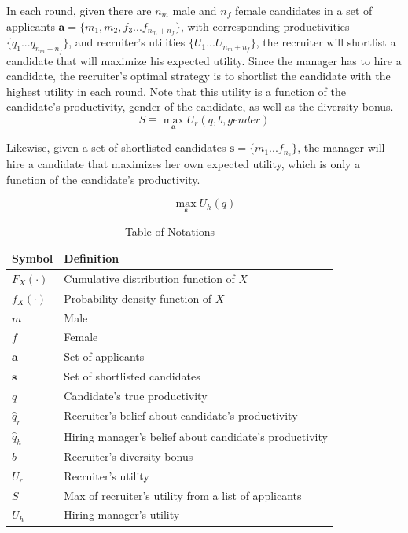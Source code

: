 \documentclass[11pt]{article}
\begin{document}
In each round, given there are $n_m$ male and $n_f$ female candidates in a set of applicants $\bm{a}=\{m_1, m_2, f_3...f_{n_m+n_f}\}$, with corresponding productivities $\{q_1...q_{n_m+n_f}\}$, and recruiter's utilities $\{U_1...U_{n_m+n_f}\}$, the recruiter will shortlist a candidate that will maximize his expected utility. Since the manager has to hire a candidate, the recruiter's optimal strategy is to shortlist the candidate with the highest utility in each round. Note that this utility is a function of the candidate's productivity, gender of the candidate, as well as the diversity bonus.
$$S \equiv \max_{\bm{a}} U_r(q, b, \textit{gender})$$

Likewise, given a set of shortlisted candidates $\bm{s}=\{m_1...f_{n_s}\}$, the manager will hire a candidate that maximizes her own expected utility, which is only a function of the candidate's productivity.

$$\max_{\bm{s}} U_h(q)$$

\begin{table}
    \caption{Table of Notations}
    \begin{center}

        \begin{tabular}{ l l}
            \hline
            Symbol       & Definition                                             \\
            \hline
            $F_X(\cdot)$ & Cumulative distribution function of $X$                \\
            $f_X(\cdot)$ & Probability density function of $X$                    \\
            $m$          & Male                                                   \\
            $f$          & Female                                                 \\
            $\bm{a}$     & Set of applicants                                      \\
            $\bm{s}$     & Set of shortlisted candidates                          \\
            $q$          & Candidate's true productivity                          \\
            $\hat{q}_r$  & Recruiter's belief about candidate's productivity      \\
            $\hat{q}_h$  & Hiring manager's belief about candidate's productivity \\
            $b$          & Recruiter's diversity bonus                            \\
            $U_r$        & Recruiter's utility                                    \\
            $S$          & Max of recruiter's utility from a list of applicants   \\
            $U_h$        & Hiring manager's utility                               \\
        \end{tabular}
    \end{center}


\end{table}
\end{document}
